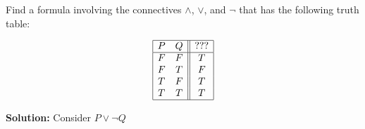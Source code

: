 Find a formula involving the connectives $\wedge$, $\vee$, and $\neg$ that has the following truth table:

\[
\begin{array}{|cc||c|}
\hline
P & Q & ??? \\
\hline
F & F & T \\
F & T & F \\
T & F & T \\
T & T & T \\
\hline
\end{array}
\]

\textbf{Solution:}  Consider $P \vee \neg Q$

\pagebreak